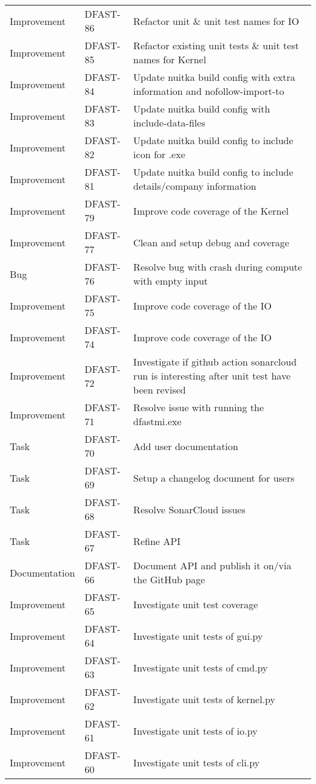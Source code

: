 \documentclass{deltares_memo}
\begin{document}
\begin{longtable}{l|l|p{8cm}}
Improvement & DFAST-86 & Refactor unit \& unit test names for IO \\
Improvement & DFAST-85 & Refactor existing unit tests \& unit test names for Kernel \\
Improvement & DFAST-84 & Update nuitka build config with extra information and nofollow-import-to \\
Improvement & DFAST-83 & Update nuitka build config with include-data-files \\
Improvement & DFAST-82 & Update nuitka build config to include icon for .exe \\
Improvement & DFAST-81 & Update nuitka build config to include details/company information \\
Improvement & DFAST-79 & Improve code coverage of the Kernel  \\
Improvement & DFAST-77 & Clean and setup debug and coverage \\
Bug & DFAST-76 & Resolve bug with crash during compute with empty input \\
Improvement & DFAST-75 & Improve code coverage of the IO \\
Improvement & DFAST-74 & Improve code coverage of the IO  \\
Improvement & DFAST-72 & Investigate if github action sonarcloud run is interesting after unit test have been revised \\
Improvement & DFAST-71 & Resolve issue with running the dfastmi.exe \\
Task & DFAST-70 & Add user documentation \\
Task & DFAST-69 & Setup a changelog document for users \\
Task & DFAST-68 & Resolve SonarCloud issues \\
Task & DFAST-67 & Refine API \\
Documentation & DFAST-66 & Document API and publish it on/via the GitHub page \\
Improvement & DFAST-65 & Investigate unit test coverage \\
Improvement & DFAST-64 & Investigate unit tests of gui.py \\
Improvement & DFAST-63 & Investigate unit tests of cmd.py \\
Improvement & DFAST-62 & Investigate unit tests of kernel.py \\
Improvement & DFAST-61 & Investigate unit tests of io.py \\
Improvement & DFAST-60 &  Investigate unit tests of cli.py \\

\end{longtable}
\end{document}
